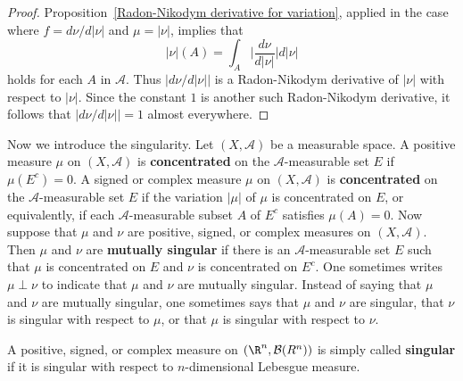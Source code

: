 \begin{proof}
Proposition~\ref{Radon-Nikodym derivative for variation}, applied in the case where $f=d\nu/d|\nu|$ and $\mu=|\nu|$, implies that
\[|\nu|(A)=\int_A\Big|\frac{d\nu}{d|\nu|}\Big|d|\nu|\]
holds for each $A$ in $\mathcal{A}$. Thus $|d\nu/d|\nu||$ is a Radon-Nikodym derivative of $|\nu|$ with respect to $|\nu|$. Since the constant $1$ is another such Radon-Nikodym derivative, it follows
that $|d\nu/d|\nu||=1$ almost everywhere.
\end{proof}
Now we introduce the singularity. Let $(X,\mathcal{A})$ be a measurable space. A positive measure $\mu$ on $(X,\mathcal{A})$ is \textbf{concentrated} on the $\mathcal{A}$-measurable set $E$ if $\mu(E^c)=0$. A signed or complex measure $\mu$ on $(X,\mathcal{A})$ is \textbf{concentrated} on the $\mathcal{A}$-measurable set $E$ if the variation $|\mu|$ of $\mu$ is concentrated on $E$, or equivalently, if each $\mathcal{A}$-measurable subset $A$ of $E^c$ satisfies $\mu(A)=0$. Now suppose that $\mu$ and $\nu$ are positive, signed, or complex measures on $(X,\mathcal{A})$. Then $\mu$ and $\nu$ are \textbf{mutually singular} if there is an $\mathcal{A}$-measurable set $E$ such that $\mu$ is concentrated on $E$ and $\nu$ is concentrated on $E^c$. One sometimes writes $\mu\perp\nu$ to indicate that $\mu$ and $\nu$ are mutually singular. Instead of saying that $\mu$ and $\nu$ are mutually singular, one sometimes says that $\mu$ and $\nu$ are singular, that $\nu$ is singular with respect to $\mu$, or that $\mu$ is singular with respect to $\nu$.\par
A positive, signed, or complex measure on $(\R^n,\mathcal{B}(R^n))$ is simply called \textbf{singular} if it is singular with respect to $n$-dimensional Lebesgue measure.
